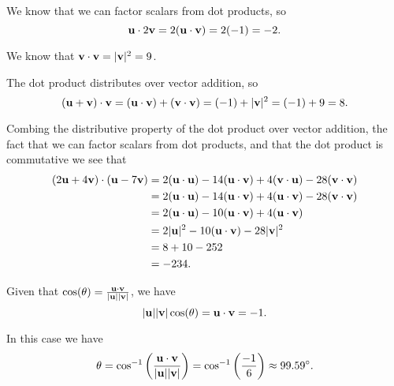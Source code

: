 \begin{exercises}
\begin{exerciseSolution}
    \ba
    \item We know that we can factor scalars from dot products, so
\[\mathbf{u} \cdot 2\mathbf{v} = 2 (\mathbf{u} \cdot \mathbf{v}) = 2(-1) = -2.\]

    \item We know that $\mathbf{v} \cdot \mathbf{v} = |\mathbf{v}|^2 = 9$.
    
    \item The dot product distributes over vector addition, so 
\[(\mathbf{u} + \mathbf{v}) \cdot \mathbf{v} = (\mathbf{u} \cdot \mathbf{v}) + (\mathbf{v} \cdot \mathbf{v}) = (-1) + |\mathbf{v}|^2 = (-1) + 9 = 8.\]

    \item Combing the distributive property of the dot product over vector addition, the fact that we can factor scalars from dot products, and that the dot product is commutative we see that  
\begin{align*}
(2\mathbf{u}+4\mathbf{v}) \cdot (\mathbf{u} - 7\mathbf{v}) &= 2(\mathbf{u} \cdot \mathbf{u}) - 14(\mathbf{u} \cdot \mathbf{v}) + 4(\mathbf{v} \cdot \mathbf{u}) - 28 (\mathbf{v} \cdot \mathbf{v}) \\
	&= 2(\mathbf{u} \cdot \mathbf{u}) - 14(\mathbf{u} \cdot \mathbf{v}) + 4(\mathbf{u} \cdot \mathbf{v}) - 28 (\mathbf{v} \cdot \mathbf{v}) \\
    &= 2(\mathbf{u} \cdot \mathbf{u}) - 10(\mathbf{u} \cdot \mathbf{v}) + 4(\mathbf{u} \cdot \mathbf{v}) \\
    &= 2|\mathbf{u}|^2 - 10(\mathbf{u} \cdot \mathbf{v}) - 28 |\mathbf{v}|^2 \\
    &= 8+10-252 \\
    &=-234.
 \end{align*}
 
    
    \item Given that $\cos(\theta) = \frac{\mathbf{u} \cdot \mathbf{v}}{|\mathbf{u}| |\mathbf{v}|}$, we have 
\[|\mathbf{u}| |\mathbf{v}| \cos(\theta) = \mathbf{u} \cdot \mathbf{v} = -1.\]
    
    \item In this case we have 
\[\theta = \cos^{-1}\left(\frac{\mathbf{u} \cdot \mathbf{v}}{|\mathbf{u}| |\mathbf{v}|}\right) = \cos^{-1}\left(\frac{-1}{6}\right) \approx 99.59^{\circ}.\] 

    \ea
    
\end{exerciseSolution}





\end{exercises}
